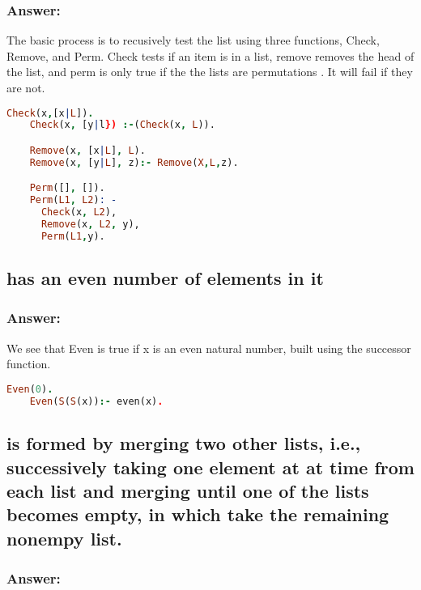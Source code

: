 \documentclass[titlepage]{article}\usepackage[]{graphicx}\usepackage[]{color}
\begin{document}
  \subsubsection{Answer:}
  The basic process is to recusively test the list using three functions,
  Check, Remove, and Perm. Check tests if an item is in a list, remove removes
  the head of the list, and perm is only true if the the lists are permutations
  . It will fail if they are not.
  
  \begin{lstlisting}[language=Prolog]
    Check(x,[x|L]).
    Check(x, [y|l}) :-(Check(x, L)).

    Remove(x, [x|L], L).
    Remove(x, [y|L], z):- Remove(X,L,z).

    Perm([], []).
    Perm(L1, L2): - 
      Check(x, L2),
      Remove(x, L2, y),
      Perm(L1,y).
  \end{lstlisting}

  \subsection{has an even number of elements in it}
  \subsubsection{Answer:}

  We see that Even is true if x is an even natural number, built using the
  successor function.
  \begin{lstlisting}[language=Prolog]
    Even(0).
    Even(S(S(x)):- even(x).
  \end{lstlisting}


  \subsection{is formed by merging two other lists, i.e., successively
  taking one element at at time from each list and merging until one of the
  lists becomes empty, in which take the remaining nonempy list.}
  \subsubsection{Answer:}


  
\end{document}
